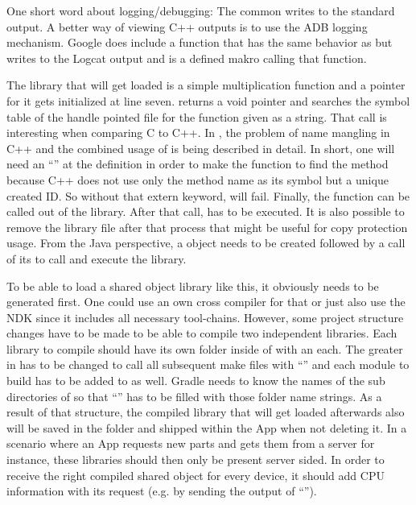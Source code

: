 One short word about logging/debugging: The common  writes to the standard output. A better way of viewing C++ outputs is to use the ADB logging mechanism. Google does include a  function that
has the same behavior as  but writes to the Logcat output and
 is a defined makro calling that function.

The library that will get loaded is a simple multiplication function and a pointer
for it gets initialized at line seven.  returns a void pointer and
 searches the symbol table of the handle pointed file for the function
given as a string. That call is interesting when comparing C to C++. In
\parencite{dlopen_howto}, the problem of name mangling in C++ and the combined usage of
 is being described in detail.
In short, one will need an ``'' at the  definition in order to make the  function to find the method
because C++ does not use only the method name as its symbol but a unique created ID.
So without that extern keyword,  will fail.
Finally, the  function can be called out of the library.
After that call,  has to be executed. It is also possible to remove
the library file after that process that might be useful for copy protection usage.
From the Java perspective, a  object needs to be created followed by
a call of its  to call and execute the library.

To be able to load a shared object library like this, it obviously needs to be
generated first. One could use an own cross compiler for that or just also use
the NDK since it includes all necessary tool-chains.
However, some project structure changes have to be made to be able to compile two independent libraries. Each library to compile should have its own folder inside
of  with an  each. The greater  in
 has to be changed to call all subsequent make files with
``'' and each module to build has to be
added to  as well. Gradle needs to know the names of the sub
directories of  so that ``'' has to be
filled with those folder name strings. As a result of that structure, the compiled
library that will get loaded afterwards also will be saved in the  folder
and shipped within the App when not deleting it. In a scenario where an App requests new
parts and gets them from a server for instance, these libraries should then only be
present server sided. In order to receive the right compiled shared object for every
device, it should add CPU information with its request (e.g. by sending the output
of ``'').

